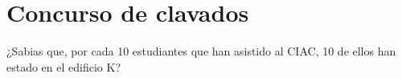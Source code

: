 \section{Concurso de clavados}

¿Sabias que, por cada 10 estudiantes que han asistido al CIAC, 10 de ellos han estado en el edificio K?
	
